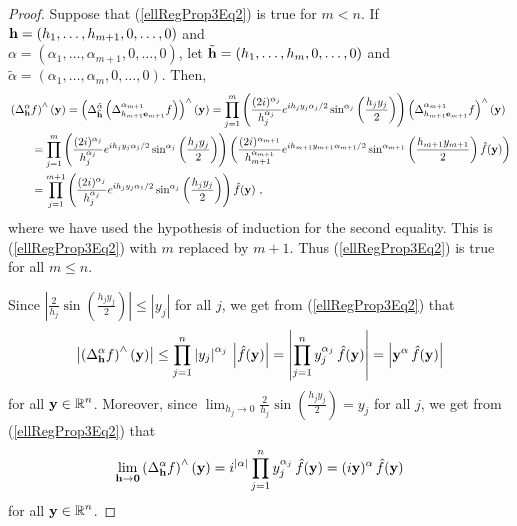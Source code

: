 \begin{proof}
Suppose that (\ref{ellRegProp3Eq2}) is true for $m < n$.  If
$\mathbf{h} = (h_1,\ldots,h_{m+1},0,\ldots,0)$ and\\
$\alpha = (\alpha_1,\ldots,\alpha_{m+1},0,\ldots,0)$, let
$\tilde{\mathbf{h}} = (h_1,\ldots,h_m,0,\ldots,0)$ and
$\tilde{\alpha} = (\alpha_1,\ldots,\alpha_m,0,\ldots,0)$.  Then,
\begin{align*}
&\left(\Delta^\alpha_{\VEC{h}} f \right)^\wedge(\VEC{y})
= \left( \Delta^{\tilde{\alpha}}_{\tilde{\VEC{h}}}
\left( \Delta^{\alpha_{m+1}}_{h_{m+1}\VEC{e}_{m+1}} f \right)\right)^\wedge
(\VEC{y})
= \prod_{j=1}^m \left(\frac{(2i)^{\alpha_j}}{h_j^{\alpha_j}}
e^{i h_j y_j \alpha_j/2}
\sin^{\alpha_j}\left(\frac{h_j y_j}{2}\right) \right)
\left( \Delta^{\alpha_{m+1}}_{h_{m+1}\VEC{e}_{m+1}} f \right)^\wedge(\VEC{y}) \\
&\qquad
= \prod_{j=1}^m \left(\frac{(2i)^{\alpha_j}}{h_j^{\alpha_j}}
e^{i h_j y_j \alpha_j/2}
\sin^{\alpha_j}\left(\frac{h_j y_j}{2}\right) \right)
\left( \frac{(2i)^{\alpha_{m+1}}}{h_{m+1}^{\alpha_{m+1}}}
e^{i h_{m+1} y_{m+1} \alpha_{m+1}/2}
\sin^{\alpha_{m+1}}\left(\frac{h_{m+1} y_{m+1}}{2}\right)
\hat{f}(\VEC{y}) \right) \\
&\qquad
=\prod_{j=1}^{m+1} \left(\frac{(2i)^{\alpha_j}}{h_j^{\alpha_j}}
e^{i h_j y_j \alpha_1/2}
\sin^{\alpha_j}\left(\frac{h_j y_j}{2}\right) \right)\hat{f}(\VEC{y}) \ ,
\end{align*}
where we have used the hypothesis of induction for the second equality.
This is (\ref{ellRegProp3Eq2}) with $m$ replaced by $m+1$.
Thus (\ref{ellRegProp3Eq2}) is true for all $m \leq n$.

Since $\displaystyle \left| \frac{2}{h_j}
\sin\left(\frac{h_j y_j}{2}\right)\right| \leq |y_j|$ for all $j$, we
get from (\ref{ellRegProp3Eq2}) that
\begin{equation} \label{ellRegProp3Eq3}
\left| \left(\Delta^\alpha_{\mathbf{h}} f\right)^\wedge(\mathbf{y}) \right|
\leq \prod_{j=1}^n \left| y_j \right|^{\alpha_j}
\,\left| \hat{f}(\mathbf{y})\right|
= \left| \prod_{j=1}^n y_j^{\alpha_j} \,\hat{f}(\mathbf{y})\right|
= \left| \mathbf{y}^\alpha \,\hat{f}(\mathbf{y})\right|
\end{equation}
for all $\displaystyle \mathbf{y} \in \mathbb{R}^n$.  Moreover, since
$\displaystyle \lim_{h_j \to 0} \frac{2}{h_j} \sin\left(\frac{h_j y_j}{2}\right)
= y_j$ for all $j$, we get from (\ref{ellRegProp3Eq2}) that
\begin{equation} \label{ellRegProp3Eq4}
\lim_{\mathbf{h}\to \mathbf{0}}  \left(\Delta^\alpha_{\mathbf{h}} f\right)^\wedge(\mathbf{y})
= i^{|\alpha|} \prod_{j=1}^n y_j^{\alpha_j} \,\hat{f}(\mathbf{y})
= (i\mathbf{y})^\alpha \,\hat{f}(\mathbf{y})
\end{equation}
for all $\displaystyle \mathbf{y} \in \mathbb{R}^n$.


\end{proof}
